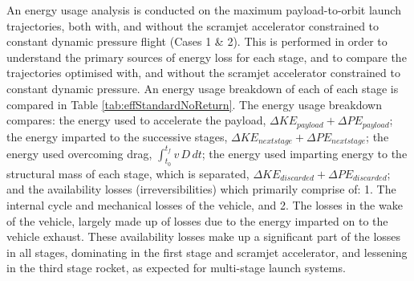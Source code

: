 
% 











An energy usage analysis is conducted on the maximum payload-to-orbit launch trajectories, both with, and without the scramjet accelerator constrained to constant dynamic pressure flight (Cases 1 \& 2). This is performed in order to understand the primary sources of energy loss for each stage, and to compare the trajectories optimised with, and without the scramjet accelerator constrained to constant dynamic pressure. An energy usage breakdown of each of each stage is compared in Table \ref{tab:effStandardNoReturn}. The energy usage breakdown compares: the energy used to accelerate the payload, $\Delta KE_{payload} + \Delta PE_{payload}$; the energy imparted to the successive stages, $\Delta KE_{next stage} + \Delta PE_{next stage}$; the energy used overcoming drag, $\int_{t_0}^{t_f} v\,D \, dt$; the energy used imparting energy to the structural mass of each stage, which is separated, $\Delta KE_{discarded} + \Delta PE_{discarded}$; and the availability losses (irreversibilities) which primarily comprise of: 1. The internal cycle and mechanical losses of the vehicle, and 2. The losses in the wake of the vehicle, largely made up of losses due to the energy imparted on to the vehicle exhaust\cite{Riggins2019,Riggins2013}. These availability losses make up a significant part of the losses in all stages, dominating in the first stage and scramjet accelerator, and lessening in the third stage rocket, as expected for multi-stage launch systems\cite{Riggins2019,Riggins2013,Gilbert2015}. 

